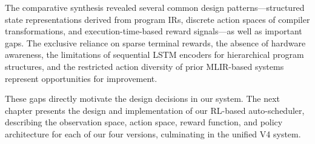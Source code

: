 The comparative synthesis revealed several common design patterns—structured state representations derived from program IRs, discrete action spaces of compiler transformations, and execution-time-based reward signals—as well as important gaps. The exclusive reliance on sparse terminal rewards, the absence of hardware awareness, the limitations of sequential LSTM encoders for hierarchical program structures, and the restricted action diversity of prior MLIR-based systems represent opportunities for improvement.

These gaps directly motivate the design decisions in our system. The next chapter presents the design and implementation of our RL-based auto-scheduler, describing the observation space, action space, reward function, and policy architecture for each of our four versions, culminating in the unified V4 system.

